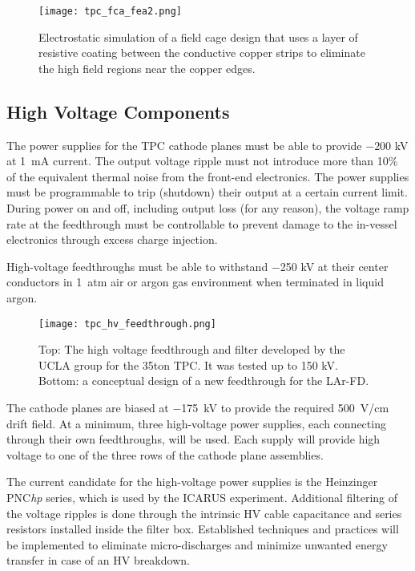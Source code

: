 \begin{figure}[htbp]
\centering
\texttt{[image: tpc\_fca\_fea2.png]}
\caption[FCA with resistive coating]{Electrostatic simulation of a field cage design that uses a layer of resistive coating between the conductive copper strips to eliminate the high field regions near the copper edges. }
\label{fig:tpc-field-cage-resistive-coating}
\end{figure}    


\subsection{High Voltage Components}
\label{subsec:v5-tpc-hv}
   
The power supplies for the TPC cathode planes 
must be able to provide $-200$ kV at 1~mA current. The output voltage ripple 
must not introduce more than 10\% of the equivalent thermal noise from the front-end electronics. 
The power supplies must be programmable to trip (shutdown) 
their output at a certain current limit.  During power on and off, 
including output loss (for any reason), the voltage ramp rate at the 
feedthrough must be controllable to prevent 
damage to the in-vessel electronics through excess charge injection.

High-voltage feedthroughs must be able to withstand $-$250 kV 
at their center conductors in 1~atm air or argon gas environment when terminated in liquid argon.


\begin{figure}[htbp]
\centering
\texttt{[image: tpc\_hv\_feedthrough.png]}
\caption[concept of new feedthrough]{Top: The high voltage feedthrough and filter developed by the UCLA 
group for the 35ton TPC.  It was tested up to 150 kV.  Bottom: a conceptual design of a new feedthrough for the LAr-FD.}
\label{fig:tpc-UCLA-feedthrough}
\end{figure}

The cathode planes are biased at $-$175~kV to provide the required 
500~V/cm drift field. At a minimum, three high-voltage power 
supplies, each connecting through their own feedthroughs, will be used. Each supply will
provide high voltage to one of the three rows of the cathode plane assemblies.

The current candidate for the high-voltage power supplies is 
the Heinzinger PNC{\it hp} series, which is used by the ICARUS 
experiment.  Additional filtering of the voltage ripples is done through the intrinsic HV cable capacitance 
and series resistors installed inside the filter box. Established techniques and practices will be implemented to eliminate 
micro-discharges and minimize unwanted energy transfer in case of an HV breakdown. 
  
